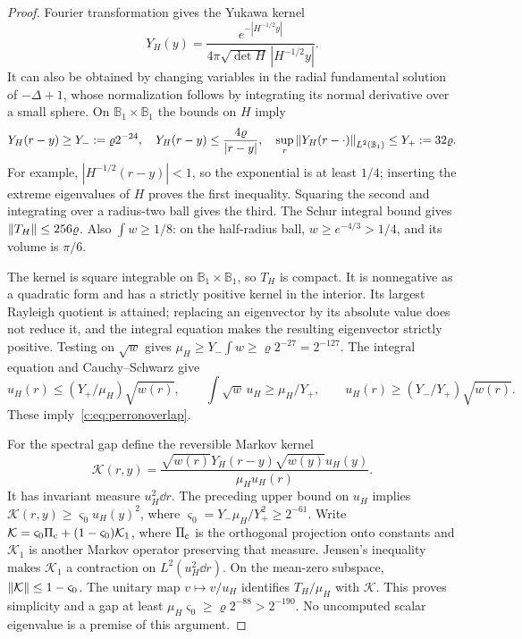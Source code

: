 \begin{proof}
Fourier transformation gives the Yukawa kernel
\[
 Y_H(y)=\frac{e^{-|H^{-1/2}y|}}
 {4\pi\sqrt{\det H}\,|H^{-1/2}y|}.
\]
It can also be obtained by changing variables in the radial fundamental
solution of $-\Delta+1$, whose normalization follows by integrating its
normal derivative over a small sphere. On $\mathbb B_1\times\mathbb B_1$ the bounds
on $H$ imply
\begin{equation}
 Y_H(r-y)\ge Y_-:=\varrho2^{-24},\quad
 Y_H(r-y)\le\frac{4\varrho}{|r-y|},\quad
 \sup_r\left\lVert Y_H(r-\cdot)\right\rVert_{L^2(\mathbb B_1)}\le Y_+:=32\varrho.
                                                               \label{c:eq:yukawabounds}
\end{equation}
For example, $|H^{-1/2}(r-y)|<1$, so the exponential is at least
$1/4$; inserting the extreme eigenvalues of $H$ proves the first
inequality. Squaring the second and integrating over a radius-two ball
gives the third. The Schur integral bound gives $\left\lVert T_H\right\rVert\le256\varrho$.
Also $\int w\ge1/8$: on the half-radius ball, $w\ge e^{-4/3}>1/4$,
and its volume is $\pi/6$.

The kernel is square integrable on $\mathbb B_1\times\mathbb B_1$, so $T_H$ is
compact. It is nonnegative as a quadratic form and has a strictly
positive kernel in the interior. Its largest Rayleigh quotient is
attained; replacing an eigenvector by its absolute value does not
reduce it, and the integral equation makes the resulting eigenvector
strictly positive. Testing on $\sqrt w$ gives
$\mu_H\ge Y_-\int w\ge\varrho2^{-27}=2^{-127}$.
The integral equation and Cauchy--Schwarz give
\[
 u_H(r)\le(Y_+/\mu_H)\sqrt{w(r)},\qquad
 \int\sqrt w\,u_H\ge\mu_H/Y_+,
 \qquad u_H(r)\ge(Y_-/Y_+)\sqrt{w(r)}.
\]
These imply~\eqref{c:eq:perronoverlap}.

For the spectral gap define the reversible Markov kernel
\[
 \mathcal K(r,y)=\frac{\sqrt{w(r)}Y_H(r-y)\sqrt{w(y)}u_H(y)}
 {\mu_Hu_H(r)}.
\]
It has invariant measure $u_H^2\dd r$. The preceding upper bound on
$u_H$ implies
$\mathcal K(r,y)\ge\varsigma_0u_H(y)^2$, where
$\varsigma_0=Y_-\mu_H/Y_+^2\ge2^{-61}$.
Write $\mathcal K=\varsigma_0\Pi_{\rm c}+(1-\varsigma_0)\mathcal K_1$, where $\Pi_{\rm c}$ is the orthogonal projection onto constants and $\mathcal K_1$ is another
Markov operator preserving that measure. Jensen's inequality makes
$\mathcal K_1$ a contraction on $L^2(u_H^2\dd r)$. On the mean-zero subspace,
$\left\lVert \mathcal K\right\rVert\le1-\varsigma_0$. The unitary map $v\mapsto v/u_H$
identifies $T_H/\mu_H$ with $\mathcal K$. This proves simplicity and a gap at
least $\mu_H\varsigma_0\ge\varrho2^{-88}>2^{-190}$.
No uncomputed scalar eigenvalue is a premise of this argument.
\end{proof}

